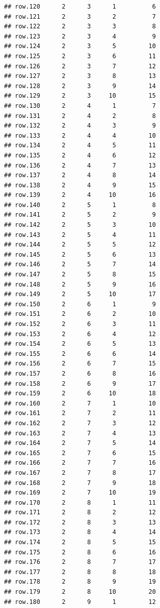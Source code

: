 \documentclass[
]{article}
\begin{document}
\begin{verbatim}
## row.120      2      3      1          6
## row.121      2      3      2          7
## row.122      2      3      3          8
## row.123      2      3      4          9
## row.124      2      3      5         10
## row.125      2      3      6         11
## row.126      2      3      7         12
## row.127      2      3      8         13
## row.128      2      3      9         14
## row.129      2      3     10         15
## row.130      2      4      1          7
## row.131      2      4      2          8
## row.132      2      4      3          9
## row.133      2      4      4         10
## row.134      2      4      5         11
## row.135      2      4      6         12
## row.136      2      4      7         13
## row.137      2      4      8         14
## row.138      2      4      9         15
## row.139      2      4     10         16
## row.140      2      5      1          8
## row.141      2      5      2          9
## row.142      2      5      3         10
## row.143      2      5      4         11
## row.144      2      5      5         12
## row.145      2      5      6         13
## row.146      2      5      7         14
## row.147      2      5      8         15
## row.148      2      5      9         16
## row.149      2      5     10         17
## row.150      2      6      1          9
## row.151      2      6      2         10
## row.152      2      6      3         11
## row.153      2      6      4         12
## row.154      2      6      5         13
## row.155      2      6      6         14
## row.156      2      6      7         15
## row.157      2      6      8         16
## row.158      2      6      9         17
## row.159      2      6     10         18
## row.160      2      7      1         10
## row.161      2      7      2         11
## row.162      2      7      3         12
## row.163      2      7      4         13
## row.164      2      7      5         14
## row.165      2      7      6         15
## row.166      2      7      7         16
## row.167      2      7      8         17
## row.168      2      7      9         18
## row.169      2      7     10         19
## row.170      2      8      1         11
## row.171      2      8      2         12
## row.172      2      8      3         13
## row.173      2      8      4         14
## row.174      2      8      5         15
## row.175      2      8      6         16
## row.176      2      8      7         17
## row.177      2      8      8         18
## row.178      2      8      9         19
## row.179      2      8     10         20
## row.180      2      9      1         12

\end{verbatim}
\end{document}
